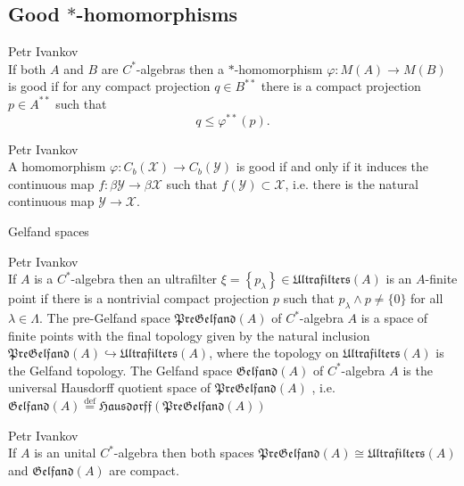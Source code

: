 \documentclass{beamer}
\theoremstyle{plain}
\newcommand{\be}{\begin{equation}}
\newcommand{\ee}{\end{equation}}
\newcommand{\sX}{\mathcal{X}}       %
\newcommand{\sY}{\mathcal{Y}}       %
\newcommand{\la}{\lambda}
\newcommand{\La}{\Lambda}
\newcommand{\bt}{\beta}           %
\newcommand{\bydef}{\stackrel{\mathrm{def}}{=}}
\newcommand{\hookto}{\hookrightarrow}        %
\begin{document}
\begin{frame}
\section{Good $*$-homomorphisms}
\begin{definition}\label{good_hom_defn}\alert{Petr Ivankov}\\
	If both $A$ and $B$ are $C^*$-algebras  then a $*$-homomorphism $\varphi : M\left(  A\right)  \to M\left( B\right) $ is \alert{good} if for any compact projection $q \in B^{**}$ there is a compact projection $p \in A^{**}$ such that
	\be 
	q \le \varphi^{**}\left(p \right). 
	\ee
\end{definition}

\begin{lemma}\alert{Petr Ivankov}\\
	A homomorphism $\varphi: C_b\left( \sX\right) \to C_b\left( \sY\right)$ is good  if and only if  it induces the continuous map  $f: \bt\sY \to \bt\sX$ such that $f\left(\sY \right) \subset \sX$, i.e. there is the natural continuous map $\sY \to \sX$.
\end{lemma}

\end{frame}
\begin{frame}
				{\Large Gelfand spaces}
	
	\begin{definition}\label{gelfand_space_defn}\alert{Petr Ivankov}\\
	If $A$ is a $C^*$-algebra then	an ultrafilter  $\xi = \left\{p_\la\right\}\in \mathfrak{Ultrafilters}\left(A \right)$ is an $A$-\alert{finite point} if there is a nontrivial compact projection $p$  such that $p_\la \wedge  p\neq \{0\}$ for all $\la\in \La$.	The \alert{pre-Gelfand space} $\mathfrak{PreGelfand}\left(A \right)$ of $C^*$-algebra $A$ is a space  of finite points with the final topology  given by the natural inclusion $\mathfrak{PreGelfand}\left(A \right) \hookto \mathfrak{Ultrafilters}\left(A \right)$, where the topology on $\mathfrak{Ultrafilters}\left(A \right)$ is the   Gelfand topology. The \alert{Gelfand space} $\mathfrak{Gelfand}\left(A \right)$ of $C^*$-algebra $A$ is the universal Hausdorff  quotient space of $\mathfrak{PreGelfand}\left(A \right)$ , i.e. $\mathfrak{Gelfand}\left(A \right)\bydef \mathfrak{Hausdorff}\left(\mathfrak{PreGelfand}\left(A \right) \right)$ \end{definition}
	\begin{lemma}\alert{Petr Ivankov}\\
	If $A$ is an unital $C^*$-algebra then both spaces  $\mathfrak{PreGelfand}\left(A \right)\cong \mathfrak{Ultrafilters}\left(A \right)$ and $\mathfrak{Gelfand}\left(A \right)$ are compact. 
\end{lemma}
	
\end{frame}
\end{document}
